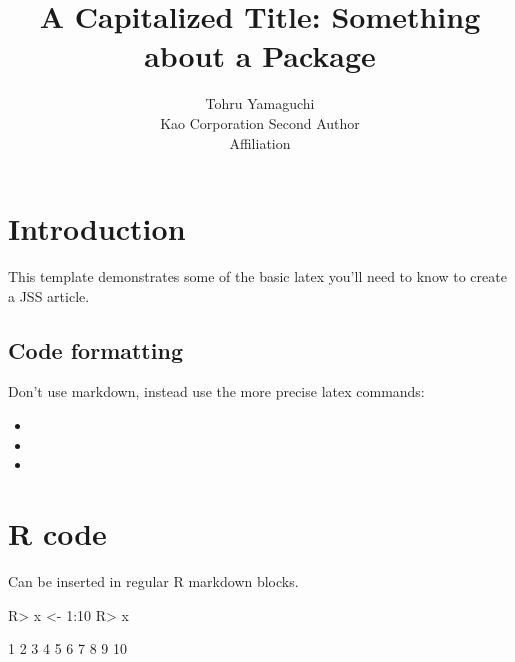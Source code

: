\documentclass[article]{jss}
\author{
Tohru Yamaguchi\\Kao Corporation \And Second Author\\Affiliation
}
\title{A Capitalized Title: Something about a Package \pkg{foo}}
\begin{document}
\hypertarget{introduction}{%
\section{Introduction}\label{introduction}}

This template demonstrates some of the basic latex you'll need to know
to create a JSS article.

\hypertarget{code-formatting}{%
\subsection{Code formatting}\label{code-formatting}}

Don't use markdown, instead use the more precise latex commands:

\begin{itemize}
\item
\item
\item
\end{itemize}

\hypertarget{r-code}{%
\section{R code}\label{r-code}}

Can be inserted in regular R markdown blocks.

\begin{CodeChunk}

\begin{CodeInput}
R> x <- 1:10
R> x
\end{CodeInput}

\begin{CodeOutput}
 [1]  1  2  3  4  5  6  7  8  9 10
\end{CodeOutput}
\end{CodeChunk}
\end{document}
